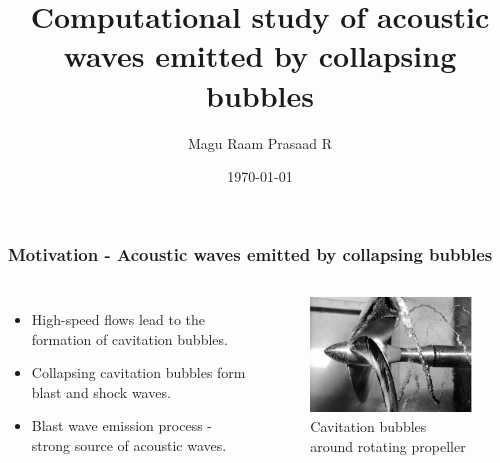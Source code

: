 \documentclass[10pt, aspectratio=169]{beamer}
\title{Computational study of acoustic waves emitted by collapsing bubbles}
\date{\today}
\author[shortname]{Magu Raam Prasaad R}
\begin{document}
\begin{frame}
	\maketitle
\end{frame}
\begin{frame}
	\frametitle{Motivation - Acoustic waves emitted by collapsing bubbles}
	\begin{columns}
		\begin{itemize}
			\item High-speed flows lead to the formation of cavitation bubbles.
			\item Collapsing cavitation bubbles form blast and shock waves.
			\item Blast wave emission process - strong source of acoustic waves.
		\end{itemize}
							
		\begin{figure}[h]
			\includegraphics[scale = 0.55]{propeller.png}
			\caption{Cavitation bubbles around rotating propeller\cite{propeller}}	
		\end{figure}
							
	\end{columns}
\end{frame}
\end{document}
